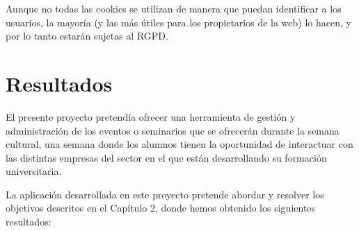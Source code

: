 \documentclass[a4paper, 12pt]{book}
\begin{document}
Aunque no todas las cookies se utilizan de manera que puedan identificar a los usuarios, la mayoría (y las más útiles para los propietarios de la web) lo hacen, y por lo tanto estarán sujetas al RGPD.



\cleardoublepage
\chapter{Resultados}

El presente proyecto pretendía ofrecer una herramienta de gestión y administración de los eventos o seminarios que se ofrecerán durante la semana cultural, una semana donde los alumnos tienen la oportunidad de interactuar con las distintas empresas del sector en el que están desarrollando su formación universitaria.

La aplicación desarrollada en este proyecto pretende abordar y resolver los objetivos descritos en el Capítulo 2, donde hemos obtenido los siguientes resultados:
\end{document}
